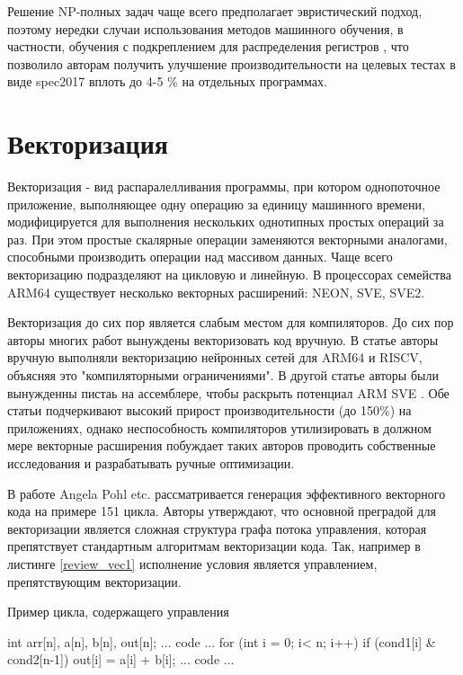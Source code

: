 Решение  NP-полных задач чаще всего предполагает эвристический подход, поэтому нередки случаи использования методов машинного обучения, в частности, обучения с подкреплением для распределения регистров \cite{venkatakeerthy2023rl4real}, что позволило авторам получить улучшение производительности на целевых тестах в виде spec2017 вплоть до 4-5 \% на отдельных программах.


\section{Векторизация} \label{pr:vectorization}
Векторизация - вид распаралелливания программы, при котором однопоточное приложение, выполняющее одну операцию за единицу машинного времени, модифицируется для выполнения нескольких однотипных простых операций за раз. При этом простые скалярные операции заменяются векторными аналогами, способными производить операции над массивом данных. Чаще всего векторизацию подразделяют на цикловую и линейную. \cite{pohl2018control} В процессорах семейства ARM64 существует несколько векторных расширений: NEON, SVE, SVE2. 

Векторизация до сих пор является слабым местом для компиляторов. До сих пор  авторы многих работ вынуждены векторизовать код вручную. В статье \cite{cococcioni2021vectorizing} авторы вручную выполняли векторизацию нейронных сетей для ARM64 и RISCV, объясняя это "компиляторными ограничениями". В другой статье авторы были вынужденны пистаь на ассемблере, чтобы раскрыть потенциал ARM SVE \cite{armejach2020using}. Обе статьи подчеркивают высокий прирост производительности (до 150\%) на приложениях, однако неспособность компиляторов утилизировать в должном мере векторные расширения побуждает таких авторов проводить собственные исследования и разрабатывать ручные оптимизации.

В работе Angela Pohl etc. \cite{pohl2018control} рассматривается генерация эффективного векторного кода на примере 151 цикла. Авторы утверждают, что основной  преградой для векторизации является сложная структура графа потока управления, которая препятствует стандартным алгоритмам векторизации кода. 
 Так, например в  листинге \ref{review_vec1} исполнение условия является управлением, препятствующим векторизации. 
  \begin{ListingEnv}[!h]
 	\captiondelim{ } %
 	\caption{Пример цикла, содержащего управления}\label{review_vec1}
 	
 	\begin{Verb}
 		int arr[n], a[n],  b[n], out[n];
 		... code ...
 		for (int i = 0; i< n; i++) {
 			if (cond1[i] & cond2[n-1]){
 				out[i] = a[i] + b[i];  
 			}
 		}
 		... code ...
 	\end{Verb}
 \end{ListingEnv}
 
